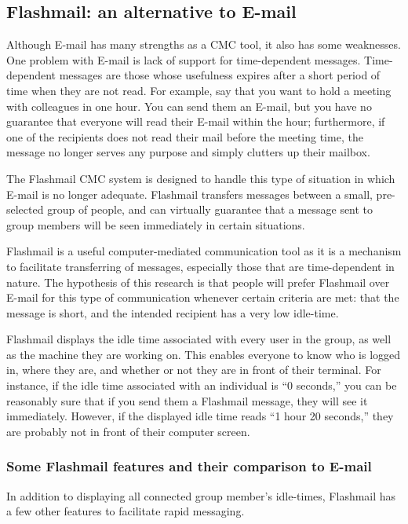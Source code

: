 \subsection{Flashmail: an alternative to E-mail}
Although E-mail has many strengths as a CMC tool, it also has some
weaknesses. One problem with E-mail is lack of support for time-dependent
messages.  Time-dependent messages are those whose usefulness expires after
a short period of time when they are not read.  For example, say that you
want to hold a meeting with colleagues in one hour. You can send them an
E-mail, but you have no guarantee that everyone will read their E-mail
within the hour; furthermore, if one of the recipients does not read their
mail before the meeting time, the message no longer serves any purpose and
simply clutters up their mailbox.  

The Flashmail CMC system is designed to handle this type of situation in
which E-mail is no longer adequate.  Flashmail transfers messages between a
small, pre-selected group of people, and can virtually guarantee that a
message sent to group members will be seen immediately in certain
situations. 

Flashmail is a useful computer-mediated communication tool as it is a
mechanism to facilitate transferring of messages, especially those that are
time-dependent in nature.  The hypothesis of this research is that people
will prefer Flashmail over E-mail for this type of communication whenever
certain criteria are met: that the message is short, and the intended
recipient has a very low idle-time. 

Flashmail displays the idle time associated with every user in the group,
as well as the machine they are working on. This enables everyone to know
who is logged in, where they are, and whether or not they are in front of
their terminal. For instance, if the idle time associated with an
individual is ``0 seconds,'' you can be reasonably sure that if you send
them a Flashmail message, they will see it immediately.  However, if the
displayed idle time reads ``1 hour 20 seconds,'' they are probably not in
front of their computer screen. 

\subsubsection{Some Flashmail features and their comparison to E-mail}

In addition to displaying all connected group member's idle-times,
Flashmail has a few other features to facilitate rapid messaging.

